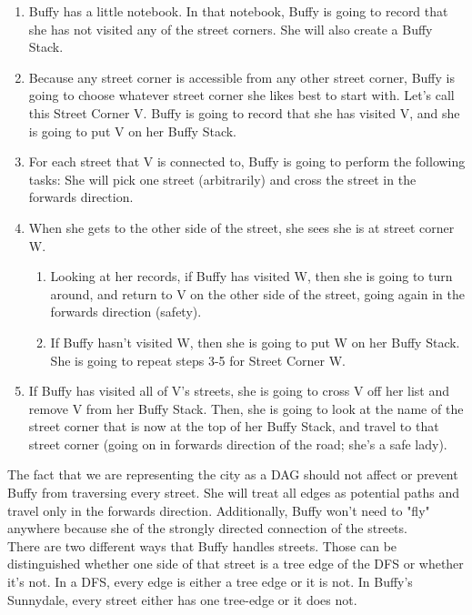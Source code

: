 \documentclass[11pt, solution, letterpaper]{format}
\begin{document}
\begin{enumerate}
\item Buffy has a little notebook. In that notebook, Buffy is going to record that she has not visited any of the street corners. She will also create a Buffy Stack. 
\item Because any street corner is accessible from any other street corner, Buffy is going to choose whatever street corner she likes best to start with. Let's call this Street Corner V. Buffy is going to record that she has visited V, and she is going to put V on her Buffy Stack.
\item For each street that V is connected to, Buffy is going to perform the following tasks: She will pick one street (arbitrarily) and cross the street in the forwards direction.
\item When she gets to the other side of the street, she sees she is at street corner W. \begin{enumerate}
\item Looking at her records, if Buffy has visited W, then she is going to turn around, and return to V on the other side of the street, going again in the forwards direction (safety).
\item If Buffy hasn't visited W, then she is going to put W on her Buffy Stack. She is going to repeat steps 3-5 for Street Corner W.
\end{enumerate}
\item  If Buffy has visited all of V's streets, she is going to cross V off her list and remove V from her Buffy Stack. Then, she is going to look at the name of the street corner that is now at the top of her Buffy Stack, and travel to that street corner (going on in forwards direction of the road; she's a safe lady).\\
\end{enumerate}

The fact that we are representing the city as a DAG should not affect or prevent Buffy from traversing every street. She will treat all edges as potential paths and travel only in the forwards direction. Additionally, Buffy won't need to "fly" anywhere because she of the strongly directed connection of the streets.\\

There are two different ways that Buffy handles streets. Those can be distinguished whether one side of that street is a tree edge of the DFS or whether it's not. In a DFS, every edge is either a tree edge or it is not. In Buffy's Sunnydale, every street either has one tree-edge or it does not.
\end{document}
